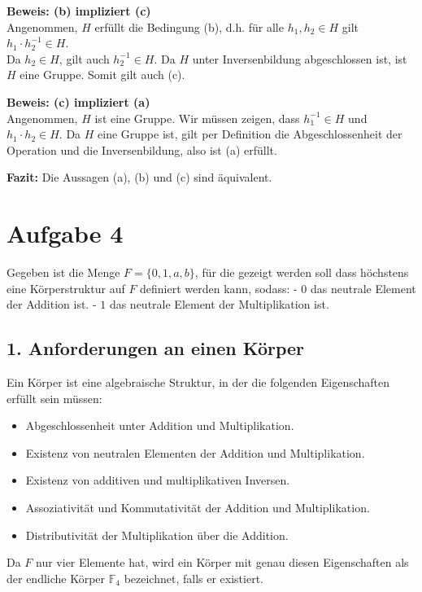 \documentclass[11pt]{article}
\begin{document}
\textbf{Beweis: (b) impliziert (c)} \\
Angenommen, \( H \) erfüllt die Bedingung (b), d.h. für alle \( h_1, h_2 \in H \) gilt \( h_1 \cdot h_2^{-1} \in H \). \\
Da \( h_2 \in H \), gilt auch \( h_2^{-1} \in H \). Da \( H \) unter Inversenbildung abgeschlossen ist, ist \( H \) eine Gruppe. Somit gilt auch (c).
\medskip

\textbf{Beweis: (c) impliziert (a)} \\
Angenommen, \( H \) ist eine Gruppe. Wir müssen zeigen, dass \( h_1^{-1} \in H \) und \( h_1 \cdot h_2 \in H \). Da \( H \) eine Gruppe ist, gilt per Definition die Abgeschlossenheit der Operation und die Inversenbildung, also ist (a) erfüllt.
\medskip

\textbf{Fazit:} Die Aussagen (a), (b) und (c) sind äquivalent.

\section*{Aufgabe 4}

Gegeben ist die Menge \( F = \{0, 1, a, b\} \), für die gezeigt werden soll dass höchstens eine Körperstruktur auf \( F \) definiert werden kann, sodass:
- \( 0 \) das neutrale Element der Addition ist.
- \( 1 \) das neutrale Element der Multiplikation ist.

\subsection*{1. Anforderungen an einen Körper}

Ein Körper ist eine algebraische Struktur, in der die folgenden Eigenschaften erfüllt sein müssen:
\begin{itemize}
    \item Abgeschlossenheit unter Addition und Multiplikation.
    \item Existenz von neutralen Elementen der Addition und Multiplikation.
    \item Existenz von additiven und multiplikativen Inversen.
    \item Assoziativität und Kommutativität der Addition und Multiplikation.
    \item Distributivität der Multiplikation über die Addition.
\end{itemize}

Da \( F \) nur vier Elemente hat, wird ein Körper mit genau diesen Eigenschaften als der endliche Körper \( \mathbb{F}_4 \) bezeichnet, falls er existiert.
\end{document}

